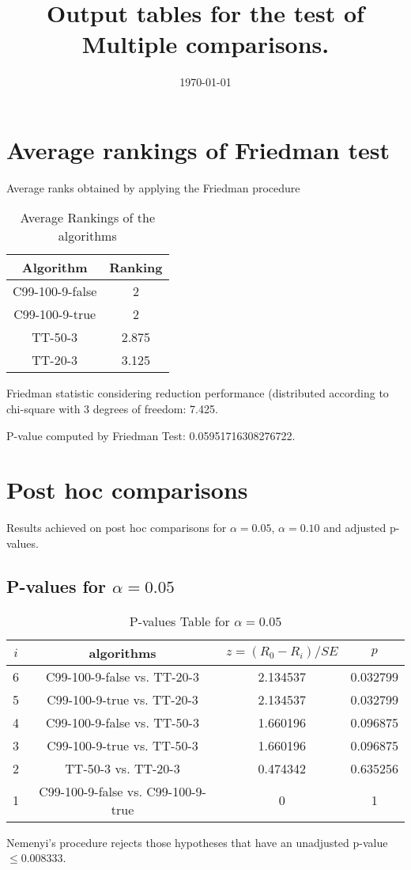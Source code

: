 \documentclass[a4paper,10pt]{article}
\title{Output tables for the test of Multiple comparisons.}
\author{}
\date{\today}
\begin{document}
\begin{landscape}
\pagestyle{empty}
\maketitle
\thispagestyle{empty}
\section{Average rankings of Friedman test}



Average ranks obtained by applying the Friedman procedure

\begin{table}[!htp]
\centering
\begin{tabular}{|c|c|}\hline
Algorithm&Ranking\\\hline
C99-100-9-false & 2\\
C99-100-9-true & 2\\
TT-50-3 & 2.875\\
TT-20-3 & 3.125\\
\hline
\end{tabular}
\caption{Average Rankings of the algorithms}
\end{table}

Friedman statistic considering reduction performance (distributed according to chi-square with 3 degrees of freedom: 7.425.

P-value computed by Friedman Test: 0.05951716308276722.\newline



\pagebreak

\section{Post hoc comparisons}

Results achieved on post hoc comparisons for $\alpha = 0.05$, $\alpha = 0.10$ and adjusted p-values.

\subsection{P-values for $\alpha=0.05$}

\begin{table}[!htp]
\centering\scriptsize
\begin{tabular}{cccc}
$i$&algorithms&$z=(R_0 - R_i)/SE$&$p$\\
\hline6&C99-100-9-false vs. TT-20-3&2.134537&0.032799\\
5&C99-100-9-true vs. TT-20-3&2.134537&0.032799\\
4&C99-100-9-false vs. TT-50-3&1.660196&0.096875\\
3&C99-100-9-true vs. TT-50-3&1.660196&0.096875\\
2&TT-50-3 vs. TT-20-3&0.474342&0.635256\\
1&C99-100-9-false vs. C99-100-9-true&0&1\\
\hline
\end{tabular}
\caption{P-values Table for $\alpha=0.05$}
\end{table}Nemenyi's procedure rejects those hypotheses that have an unadjusted p-value $\le0.008333$.


\end{landscape}
\end{document}
